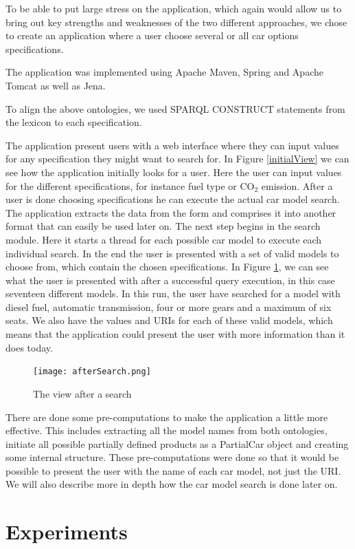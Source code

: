 \documentclass{llncs}
\begin{document}
To be able to put large stress on the application, which again would
allow us to bring out key strengths and weaknesses of the two
different approaches, we chose to create an application where a user
choose several or all car options specifications.

The application was implemented using Apache Maven, Spring and Apache
Tomcat as well as Jena.

To align the above ontologies, we used SPARQL CONSTRUCT statements
from the lexicon to each specification.

The application present users with a web interface where they can
input values for any specification they might want to search for.  In
Figure \ref{initialView} we can see how the application initially
looks for a user. Here the user can input values for the different
specifications, for instance fuel type or CO$_2$ emission. After a
user is done choosing specifications he can execute the actual car
model search. The application extracts the data from the form and
comprises it into another format that can easily be used later on. The
next step begins in the search module. Here it starts a thread for
each possible car model to execute each individual search. In the end
the user is presented with a set of valid models to choose from, which
contain the chosen specifications. In Figure \ref{afterSearch}, we
can see what the user is presented with after a successful query
execution, in this case seventeen different models. In this run, the
user have searched for a model with diesel fuel, automatic
transmission, four or more gears and a maximum of six seats. We also
have the values and URIs for each of these valid models, which means
that the application could present the user with more information than
it does today.

\begin{figure}
  \centering
      \texttt{[image: afterSearch.png]}
  \caption{The view after a search}\label{afterSearch}
\end{figure}
There are done some pre-computations to make the application a little
more effective. This includes extracting all the model names from both
ontologies, initiate all possible partially defined products as a
PartialCar object and creating some internal structure. These
pre-computations were done so that it would be possible to present the
user with the name of each car model, not just the URI. We will also
describe more in depth how the car model search is done later on.


\section{Experiments}\label{Results}
\end{document}
